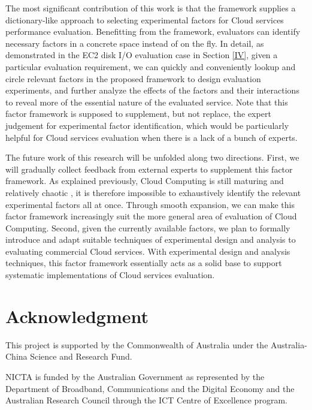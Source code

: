 \documentclass[10pt, conference, compsocconf]{IEEEtran}
\begin{document}
The most significant contribution of this work is that the framework supplies a dictionary-like approach to selecting experimental factors for Cloud services performance evaluation. Benefitting from the framework, evaluators can identify necessary factors in a concrete space instead of on the fly. In detail, as demonstrated in the EC2 disk I/O evaluation case in Section \ref{IV}, given a particular evaluation requirement, we can quickly and conveniently lookup and circle relevant factors in the proposed framework to design evaluation experiments, and further analyze the effects of the factors and their interactions to reveal more of the essential nature of the evaluated service. Note that this factor framework is supposed to supplement, but not replace, the expert judgement for experimental factor identification, which would be particularly helpful for Cloud services evaluation when there is a lack of a bunch of experts.



The future work of this research will be unfolded along two directions. First, we will gradually collect feedback from external experts to supplement this factor framework. As explained previously, Cloud Computing is still maturing and relatively chaotic \cite{Stokes_2011}, it is therefore impossible to exhaustively identify the relevant experimental factors all at once. Through smooth expansion, we can make this factor framework increasingly suit the more general area of evaluation of Cloud Computing. Second, given the currently available factors, we plan to formally introduce and adapt suitable techniques of experimental design and analysis to evaluating commercial Cloud services. With experimental design and analysis techniques, this factor framework essentially acts as a solid base to support systematic implementations of Cloud services evaluation. 

\section*{Acknowledgment}

This project is supported by the Commonwealth of Australia under the Australia-China Science and Research Fund.

NICTA is funded by the Australian Government as represented by the Department of Broadband, Communications and the Digital Economy and the Australian Research Council through the ICT Centre of Excellence program.
\end{document}
